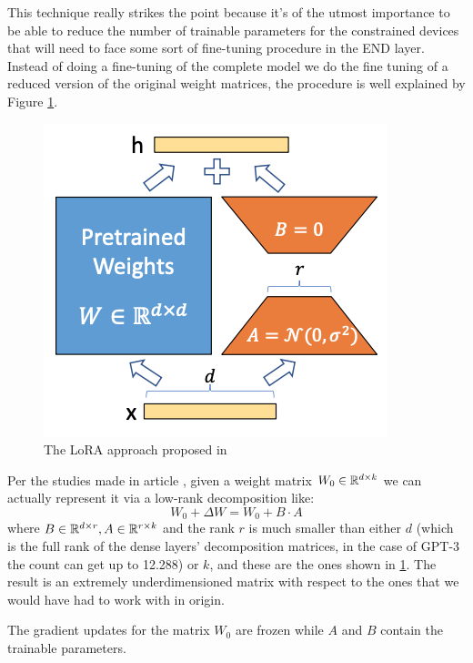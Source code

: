 This technique really strikes the point because it's of the utmost importance to be able to reduce
the number of trainable parameters for the constrained devices that will need to face some sort of
fine-tuning procedure in the END layer. Instead of doing a fine-tuning of the complete model we do
the fine tuning of a reduced version of the original weight matrices, the procedure is well
explained by Figure \ref{fig:lora}.
\begin{figure}
	\label{fig:lora}
	\centering
	\includegraphics[scale=0.7]{figures/lora.png}
	\caption{The LoRA approach proposed in \cite{lora}}
\end{figure}
Per the studies made in article \cite{lora}, given a weight matrix $W_0 \in \mathbb{R}^{d \times k}$ we can
actually represent it via a low-rank decomposition like:
\begin{equation}
	W_0 + \Delta W = W_0 + B \cdot A
\end{equation}
where $B \in \mathbb{R}^{d \times r}, A \in \mathbb{R}^{r \times k}$ and the rank $r$ is much smaller than either
$d$ (which is the full rank of the dense layers' decomposition matrices, in the case of GPT-3 the
count can get up to 12.288) or $k$, and these are the ones shown in \ref{fig:lora}. The result is an extremely underdimensioned matrix with respect to the ones that we would have had to work with in origin.

The gradient updates for the matrix $W_0$ are frozen while $A$ and $B$ contain the trainable
parameters.

